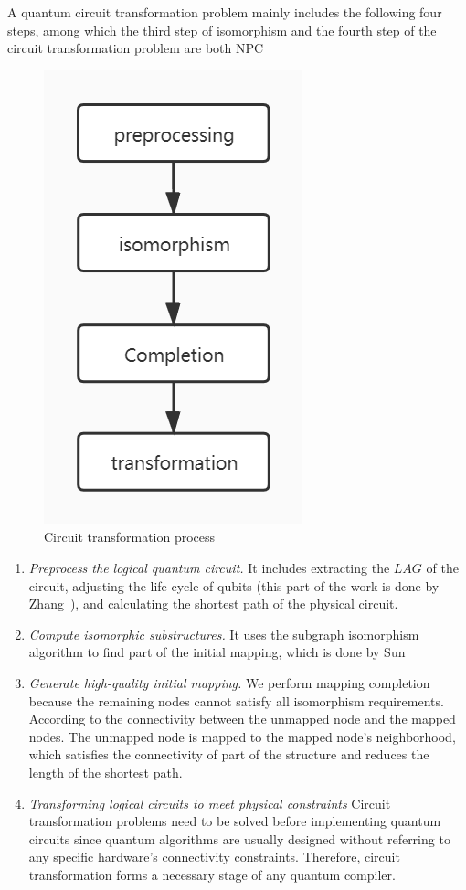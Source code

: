 \documentclass[runningheads]{llncs}
\begin{document}
A quantum circuit transformation problem mainly includes the following four steps, among which the third step of isomorphism and the fourth step of the circuit transformation problem are both NPC~\cite{2018QubitSiraichi}
\begin{figure}[h!] 
	\centering
	\includegraphics[scale=0.4]{uml.jpg}		 
	\caption{Circuit transformation process}
	\label{processing}	
	 \end{figure}
\begin{enumerate}
	\item \emph{ Preprocess the logical quantum circuit.} 
	It includes extracting the $LAG$ of the circuit, adjusting the life cycle of qubits (this part of the work is done by Zhang~\cite{2019Zhang}),  and calculating the shortest path of the physical circuit.
	\item \emph{Compute isomorphic substructures.}
	It uses the subgraph isomorphism algorithm to find part of the initial mapping, which is done by Sun~\cite{Sun2020}   
	\item \emph{Generate high-quality initial mapping.} We perform mapping completion because the remaining nodes cannot satisfy all isomorphism requirements. According to the connectivity between the unmapped node and the mapped nodes. The unmapped node is mapped to the mapped node's neighborhood, which satisfies the connectivity of part of the structure and reduces the length of the shortest path.  
	\item \emph{Transforming logical circuits to meet physical constraints}
	Circuit transformation problems need to be solved before implementing quantum circuits since quantum algorithms are usually designed without referring to any specific hardware's connectivity constraints. Therefore, circuit transformation forms a necessary stage of any quantum compiler.
\end{enumerate}
\end{document}
